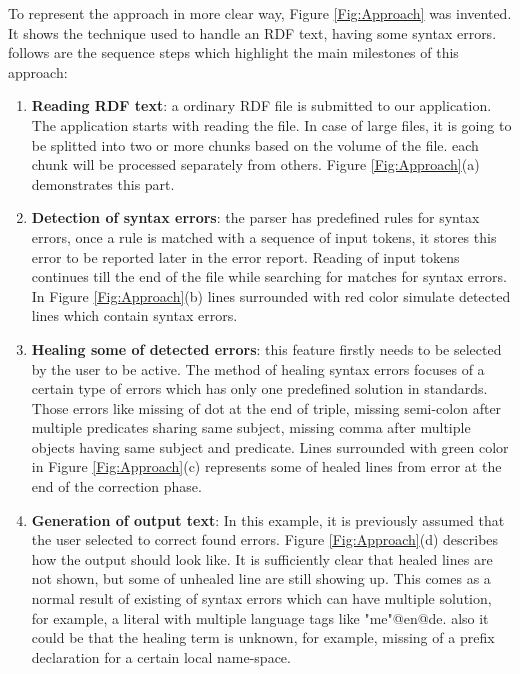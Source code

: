  To represent the approach in more clear way, {Figure \ref{Fig:Approach}} was invented. It shows the technique used to handle an RDF text, having some syntax errors. follows are the sequence steps which highlight the main milestones of this approach:
 \begin{enumerate}[label=(\alph*)]
\item \textbf{Reading RDF text}: a ordinary RDF file is submitted to our application. The application starts with reading the file. In case of large files, it is going to be splitted into two or more chunks based on the volume of the file. each chunk will be processed separately from others.  {Figure \ref{Fig:Approach}}(a) demonstrates this part. 
\item \textbf{Detection of syntax errors}: the parser has predefined rules for syntax errors, once a rule is matched with a sequence of input tokens, it stores this error to be reported later in the error report. Reading of input tokens continues till the end of the file while searching for matches for syntax errors. In  {Figure \ref{Fig:Approach}}(b) lines surrounded with red color simulate detected lines which contain syntax errors. 
\item \textbf {Healing some of detected errors}: this feature firstly needs to be selected by the user to be active. The method of healing syntax errors focuses of a certain type of errors which has only one predefined solution in standards. Those errors like missing of dot at the end of triple, missing semi-colon after multiple predicates sharing same subject, missing comma after multiple objects having same subject and predicate. Lines surrounded with green color in {Figure \ref{Fig:Approach}}(c) represents some of healed lines from error at the end of the correction phase.  
\item\textbf {Generation of output text}: In this example, it is previously assumed that the user selected to correct found errors.  {Figure \ref{Fig:Approach}}(d) describes how the output should look like. It is sufficiently clear that healed lines are not shown, but some of unhealed line are still showing up. This comes as a normal result of existing of syntax errors which can have multiple solution, for example, a literal with multiple language tags like "me"@en@de. also it could be that the healing term is unknown, for example, missing of a prefix declaration for a certain local name-space. 
\end{enumerate} 
